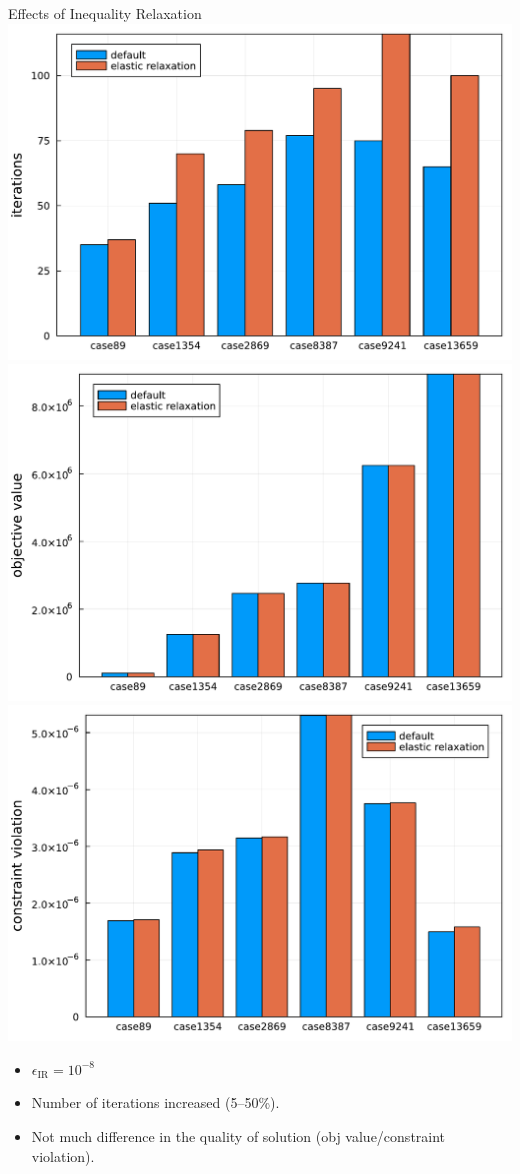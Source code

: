 \begin{frame}{Effects of Inequality Relaxation}
  \includegraphics[width=.32\textwidth]{../fig/iter.pdf}
  \includegraphics[width=.32\textwidth]{../fig/objval.pdf}
  \includegraphics[width=.32\textwidth]{../fig/cvio.pdf}
  \begin{itemize}
  \item $\epsilon_{\text{IR}}=10^{-8}$
  \item Number of iterations increased (5--50\%).
  \item Not much difference in the quality of solution (obj value/constraint violation).
  \end{itemize}
\end{frame}

